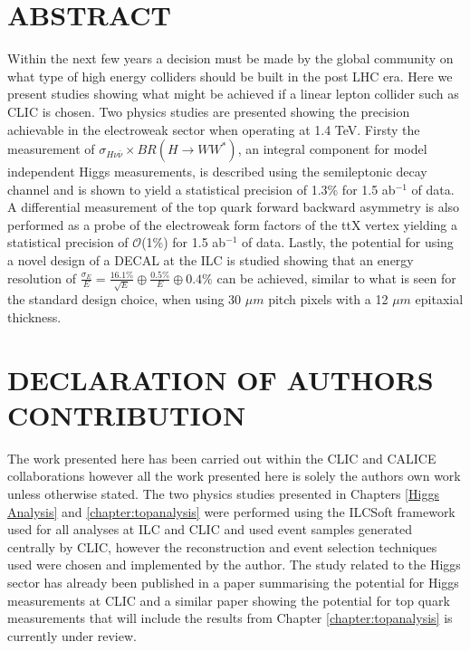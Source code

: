 \chapter*{ABSTRACT}
%
Within the next few years a decision must be made by the global community on what type of high energy colliders should be built in the post LHC era. Here we present studies showing what might be achieved if a linear lepton collider such as \ac{CLIC} is chosen. Two physics studies are presented showing the precision achievable in the electroweak sector when operating at 1.4 TeV. Firsty the measurement of $\sigma_{H\nu\bar{\nu}} \times BR(H\rightarrow WW^*)$, an integral component for model independent Higgs measurements, is described using the semileptonic decay channel and is shown to yield a statistical precision of 1.3\% for 1.5 ab$^{-1}$ of data. A differential measurement of the top quark forward backward asymmetry is also performed as a probe of the electroweak form factors of the ttX vertex yielding a statistical precision of $\mathcal{O}$(1\%) for 1.5 ab$^{-1}$ of data. Lastly, the potential for using a novel design of a \ac{DECAL} at the \ac{ILC} is studied showing that an energy resolution of $\frac{\sigma_E}{E}=\frac{16.1\%}{\sqrt{E}} \oplus \frac{0.5\%}{E} \oplus 0.4\%$ can be achieved, similar to what is seen for the standard design choice, when using 30 $\mu m$ pitch pixels with a 12 $\mu m$ epitaxial thickness.

%
\clearpage
\chapter*{DECLARATION OF AUTHORS CONTRIBUTION}
%
The work presented here has been carried out within the \ac{CLIC} and \ac{CALICE} collaborations however all the work presented here is solely the authors own work unless otherwise stated. The two physics studies presented in Chapters \ref{Higgs Analysis} and \ref{chapter:topanalysis} were performed using the ILCSoft framework used for all analyses at \ac{ILC} and \ac{CLIC} and used event samples generated centrally by \ac{CLIC}, however the reconstruction and event selection techniques used were chosen and implemented by the author. The study related to the Higgs sector has already been published in a paper summarising the potential for Higgs measurements\cite{Abramowicz:2016zbo} at \ac{CLIC} and a similar paper showing the potential for top quark measurements that will include the results from Chapter \ref{chapter:topanalysis} is currently under review\cite{TopPaperDraft}.

